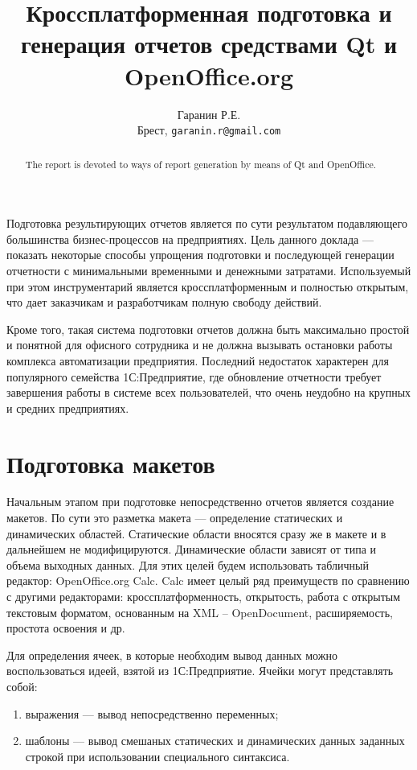 \documentclass[10pt, a5paper]{article}
\begin{document}
\title{Кросcплатформенная подготовка и генерация отчетов средствами Qt и OpenOffice.org}
\author{Гаранин Р.Е.
\\
\small Брест, \texttt{garanin.r@gmail.com}
}
\maketitle

\begin{abstract}
The report is devoted to ways of report generation by means of Qt and OpenOffice.
\end{abstract}

Подготовка результирующих отчетов является по сути результатом подавляющего большинства бизнес-процессов на предприятиях. Цель данного доклада — показать некоторые способы упрощения подготовки и последующей генерации отчетности с минимальными временными и денежными затратами. Используемый при этом инструментарий является кроссплатформенным и полностью открытым, что дает заказчикам и разработчикам полную свободу действий.

Кроме того, такая система подготовки отчетов должна быть максимально простой и понятной для офисного сотрудника и не должна вызывать остановки работы комплекса автоматизации предприятия. Последний недостаток характерен для популярного семейства 1С:Предприятие, где обновление отчетности требует завершения работы в системе всех пользователей, что очень неудобно на крупных и средних предприятиях.

\section*{Подготовка макетов}
Начальным этапом при подготовке непосредственно отчетов является создание макетов. По сути это разметка макета — определение статических и динамических областей. Статические области вносятся сразу же в макете и в дальнейшем не модифицируются. Динамические области зависят от типа и объема выходных данных. Для этих целей будем использовать табличный редактор: OpenOffice.org Calc. Calc имеет целый ряд преимуществ по сравнению с другими редакторами: кроссплатформенность, открытость, работа с открытым текстовым форматом, основанным на XML – OpenDocument, расширяемость, простота освоения и др.

Для определения ячеек, в которые необходим вывод данных можно воспользоваться идеей, взятой из 1С:Предприятие. Ячейки могут представлять собой:
\begin{enumerate}
\item выражения --- вывод непосредственно переменных;
\item шаблоны --- вывод смешаных статических и динамических данных заданных строкой при использовании специального синтаксиса.
\end{enumerate}
\end{document}
